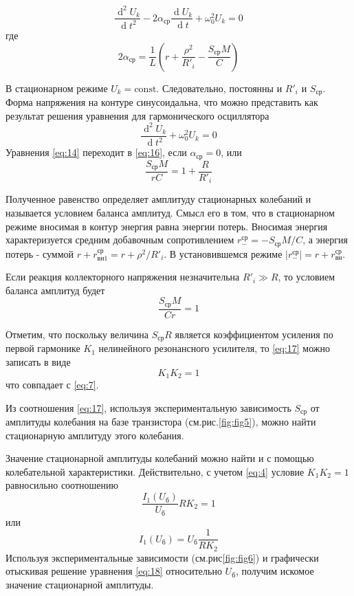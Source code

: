 \begin{equation}
\frac{\operatorname d^2U_k}{\operatorname dt^2}-2\alpha_\text{ср} \frac{\operatorname d U_k}{\operatorname dt}+\omega_0^2U_k=0
\label{eq:14}
\end{equation}
где 
\begin{equation}
2\alpha_\text{ср} = \frac{1}{L}(r+\frac{\rho^2}{R'_i}-\frac{S_\text{ср}M}{C})
\label{eq:15}
\end{equation}

В стационарном режиме $U_k=\text{const}$. Следовательно, постоянны и $R'_i$ и $S_\text{ср}$. Форма напряжения на контуре синусоидальна, что можно представить как результат решения уравнения для гармонического осциллятора
\begin{equation}
\frac{\operatorname d^2U_k}{\operatorname dt^2}+\omega_0^2U_k=0
\label{eq:16}
\end{equation}
Уравнения \eqref{eq:14} переходит в \eqref{eq:16}, если $\alpha_\text{ср}=0$, или
\begin{equation*}
\frac{S_\text{ср}M}{rC}=1+\frac{R}{R'_i}
\end{equation*}

Полученное равенство определяет амплитуду стационарных колебаний и называется условием баланса амплитуд. Смысл его в том, что в стационарном режиме вносимая в контур энергия равна энергии потерь. Вносимая энергия характеризуется средним добавочным сопротивлением $r^\text{ср}_{-}=-S_\text{ср}M/C$, а энергия потерь - суммой $r+r^\text{ср}_{\text{вн}1}=r+\rho^2/R'_i$. В установившемся режиме $|r^\text{ср}_{-}|=r+r^\text{ср}_\text{вн}$.

Если реакция коллекторного напряжения незначительна $R'_i\gg R$, то условием баланса амплитуд будет
\begin{equation}
\frac{S_\text{ср}M}{Cr}=1
\label{eq:17}
\end{equation}

Отметим, что поскольку величина $S_\text{ср}R$ является коэффициентом усиления по первой гармонике $K_1$ нелинейного резонансного усилителя, то \eqref{eq:17} можно записать в виде
\begin{equation*}
K_1K_2=1
\end{equation*}
что совпадает с \eqref{eq:7}.

Из соотношения \eqref{eq:17}, используя экспериментальную зависимость $S_\text{ср}$ от амплитуды колебания на базе транзистора (см.рис.\ref{fig:fig5}), можно найти стационарную амплитуду этого колебания.

Значение стационарной амплитуды колебаний можно найти и с помощью колебательной характеристики. Действительно, с учетом \eqref{eq:4} условие $K_1K_2=1$ равносильно соотношению
\begin{equation*}
\frac{I_1(U_\text{б})}{U_\text{б}}RK_2=1
\end{equation*}
или
\begin{equation}
I_1(U_\text{б})=U_\text{б}\frac{1}{RK_2}
\label{eq:18}
\end{equation}
Используя экспериментальные зависимости (см.рис\ref{fig:fig6}) и графически отыскивая решение уравнения \eqref{eq:18} относительно $U_\text{б}$, получим искомое значение стационарной амплитуды.


